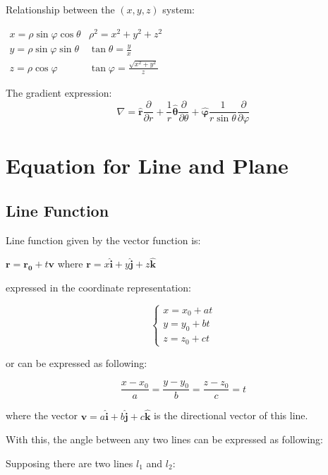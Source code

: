\documentclass[UTF8,a4paper, 10pt, openany]{svmono}
\begin{document}
\begin{enumerate}
Relationship between the $(x, y, z)$ system:
\begin{center}
$\begin{array}{cc}
x = \rho \sin \varphi \cos \theta &  \rho ^2 = x^2+y^2+z^2\\
y = \rho \sin \varphi \sin \theta &  \tan \theta = \frac{y}{x}\\
z = \rho \cos \varphi  &  \tan \varphi = \frac{\sqrt{x^2+y^2}}{z}
\end{array}$
\end{center}

The gradient expression:
\begin{equation}
 \boxed{\nabla = \mathbf{\hat{r}}\dfrac{\partial }{\partial r}+\dfrac{1}{r}\mathbf{\hat{\theta}}\dfrac{\partial }{\partial \theta}+\mathbf{\hat{\varphi}}\dfrac{1}{r\sin \theta}\dfrac{\partial }{\partial \varphi}}
\end{equation}
\end{enumerate}

\section{Equation for Line and Plane}
\subsection{Line Function}
Line function given by the vector function is:

\begin{center}
$\mathbf{r}=\mathbf{r_0}+t\mathbf{v}$
where $\mathbf{r}=x\mathbf{\hat{i}}+y\mathbf{\hat{j}}+z\mathbf{\hat{k}}$
\end{center}

expressed in the coordinate representation:

\[\begin{cases}
x=x_0+at \\
y=y_0+bt \\
z=z_0+ct
\end{cases}\]

or can be expressed as following:

\[\dfrac{x-x_0}{a}=\dfrac{y-y_0}{b}=\dfrac{z-z_0}{c}=t\]

where the vector $\mathbf{v}=a\mathbf{\hat{i}}+b\mathbf{\hat{j}}+c\mathbf{\hat{k}}$ is the directional vector of this line.

With this, the angle between any two lines can be expressed as following:

Supposing there are two lines $l_1$ and $l_2$:
\end{document}
